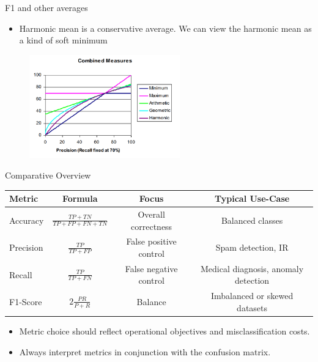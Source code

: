 \documentclass[serif, aspectratio=169]{beamer}
\begin{document}
\begin{frame}{F1 and other averages}
    \begin{itemize}
        \item Harmonic mean is a conservative average. We can view the harmonic mean as a kind of soft minimum
    \end{itemize}
    
    \begin{figure}[h]
            \centering
            
            \includegraphics[width=0.58\textwidth]{pic/F1andOthers.png}
            \end{figure}
    
    \vfill 
    
\end{frame}

\begin{frame}{Comparative Overview}
    \begin{center}
    \begin{tabular}{lccc}
        \toprule
        Metric & Formula & Focus & Typical Use-Case \\
        \midrule
        Accuracy & $\frac{TP+TN}{TP+FP+FN+TN}$ & Overall correctness & Balanced classes \\
        Precision & $\frac{TP}{TP+FP}$ & False positive control & Spam detection, IR \\
        Recall & $\frac{TP}{TP+FN}$ & False negative control & Medical diagnosis, anomaly detection \\
        F1-Score & $2\frac{PR}{P+R}$ & Balance & Imbalanced or skewed datasets \\
        \bottomrule
    \end{tabular}
    \end{center}
    \vspace{0.3cm}
    \begin{itemize}
        \item Metric choice should reflect operational objectives and misclassification costs.
        \item Always interpret metrics in conjunction with the confusion matrix.
    \end{itemize}
\end{frame}
\end{document}
